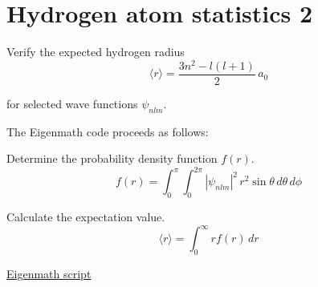 

\section*{Hydrogen atom statistics 2}

Verify the expected hydrogen radius
\begin{equation*}
\langle r\rangle=\frac{3n^2-l(l+1)}{2}\,a_0
\end{equation*}

for selected wave functions $\psi_{nlm}$.

\bigskip
The Eigenmath code proceeds as follows:

\bigskip
Determine the probability density function $f(r)$.
\begin{equation*}
f(r)=\int_0^\pi\int_0^{2\pi}|\psi_{nlm}|^2\,r^2\sin\theta\,d\theta\,d\phi
\end{equation*}

Calculate the expectation value.
\begin{equation*}
\langle r\rangle=\int_0^\infty rf(r)\,dr
\end{equation*}

\href{https://georgeweigt.github.io/examples/hydrogen-atom-statistics-2-demo.html}{Eigenmath script}


